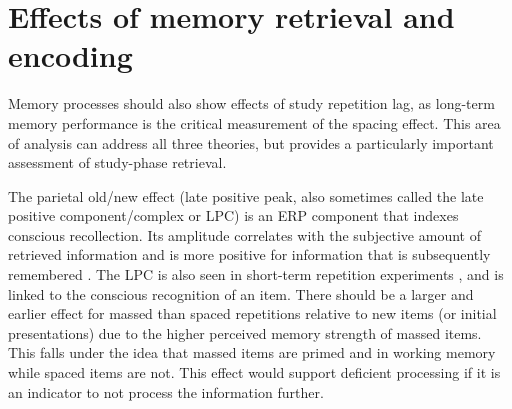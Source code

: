 
\section{Effects of memory retrieval and encoding}

Memory processes should also show effects of study repetition lag, as long-term memory performance is the critical measurement of the spacing effect.  This area of analysis
can address all three theories, but provides a particularly important assessment of study-phase retrieval.



The parietal old/new effect (late positive peak, also sometimes called the late positive component/complex or LPC) is an ERP component that indexes conscious recollection.  Its amplitude correlates with the subjective amount of retrieved information \cite{VilbEtal2006,Wild2000,WildRugg1996} and is more positive for information that is subsequently remembered \cite{RuggEtal1998a}.
The LPC is also seen in short-term repetition experiments \cite{OlicEtal2000,VanSEtal2007},
and is linked to the conscious recognition of an item.
There should be a larger and earlier effect for massed than spaced repetitions relative to new items (or initial presentations) due to the higher perceived memory strength of massed items.  This falls under the idea that massed items are primed and in working memory while spaced items are not.  This effect would support deficient processing if it is an indicator to not process the information further.


